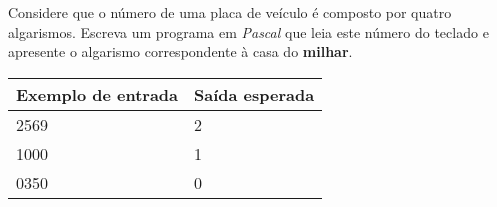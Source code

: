 \item Considere que o número de uma placa de veículo é composto por quatro 
algarismos. Escreva um programa em \emph{Pascal} que leia este número  do
teclado e apresente o algarismo correspondente à casa do \textbf{milhar}.

\begin{center}
\begin{tabular}{|l|l|} \hline
Exemplo de entrada & Saída esperada \\ \hline
2569                & 2               \\ \hline
1000                & 1               \\ \hline
0350                & 0               \\ \hline
\end{tabular}
\end{center}
